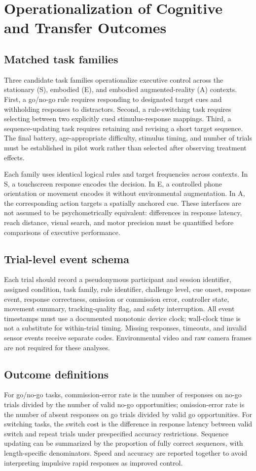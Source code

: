 \section{Operationalization of Cognitive and Transfer Outcomes}

\subsection{Matched task families}
Three candidate task families operationalize executive control across the stationary (S), embodied (E), and embodied augmented-reality (A) contexts. First, a go/no-go rule requires responding to designated target cues and withholding responses to distractors. Second, a rule-switching task requires selecting between two explicitly cued stimulus-response mappings. Third, a sequence-updating task requires retaining and revising a short target sequence. The final battery, age-appropriate difficulty, stimulus timing, and number of trials must be established in pilot work rather than selected after observing treatment effects.

Each family uses identical logical rules and target frequencies across contexts. In S, a touchscreen response encodes the decision. In E, a controlled phone orientation or movement encodes it without environmental augmentation. In A, the corresponding action targets a spatially anchored cue. These interfaces are not assumed to be psychometrically equivalent: differences in response latency, reach distance, visual search, and motor precision must be quantified before comparisons of executive performance.

\subsection{Trial-level event schema}
Each trial should record a pseudonymous participant and session identifier, assigned condition, task family, rule identifier, challenge level, cue onset, response event, response correctness, omission or commission error, controller state, movement summary, tracking-quality flag, and safety interruption. All event timestamps must use a documented monotonic device clock; wall-clock time is not a substitute for within-trial timing. Missing responses, timeouts, and invalid sensor events receive separate codes. Environmental video and raw camera frames are not required for these analyses.

\subsection{Outcome definitions}
For go/no-go tasks, commission-error rate is the number of responses on no-go trials divided by the number of valid no-go opportunities; omission-error rate is the number of absent responses on go trials divided by valid go opportunities. For switching tasks, the switch cost is the difference in response latency between valid switch and repeat trials under prespecified accuracy restrictions. Sequence updating can be summarized by the proportion of fully correct sequences, with length-specific denominators. Speed and accuracy are reported together to avoid interpreting impulsive rapid responses as improved control.

